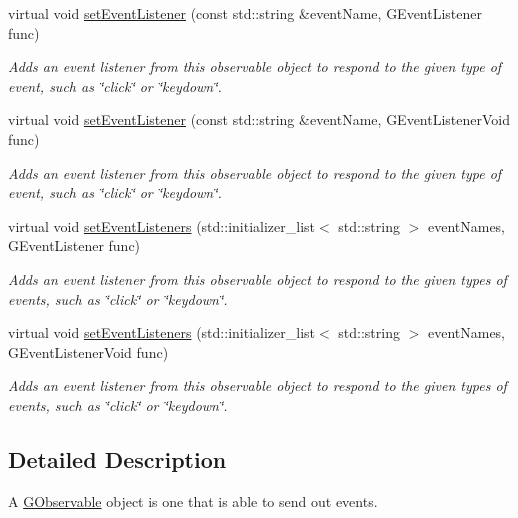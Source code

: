 \begin{DoxyCompactItemize}
virtual void \mbox{\hyperlink{classGObservable_ad2f6d34961c50f6c1e0659990b79f741}{set\+Event\+Listener}} (const std\+::string \&event\+Name, G\+Event\+Listener func)
\begin{DoxyCompactList}\small\item\em Adds an event listener from this observable object to respond to the given type of event, such as \char`\"{}click\char`\"{} or \char`\"{}keydown\char`\"{}. \end{DoxyCompactList}\item 
virtual void \mbox{\hyperlink{classGObservable_abac4cb9f9e626e010e87f5d91573c8a5}{set\+Event\+Listener}} (const std\+::string \&event\+Name, G\+Event\+Listener\+Void func)
\begin{DoxyCompactList}\small\item\em Adds an event listener from this observable object to respond to the given type of event, such as \char`\"{}click\char`\"{} or \char`\"{}keydown\char`\"{}. \end{DoxyCompactList}\item 
virtual void \mbox{\hyperlink{classGObservable_afa388d69c33c718cf035774604065604}{set\+Event\+Listeners}} (std\+::initializer\+\_\+list$<$ std\+::string $>$ event\+Names, G\+Event\+Listener func)
\begin{DoxyCompactList}\small\item\em Adds an event listener from this observable object to respond to the given types of events, such as \char`\"{}click\char`\"{} or \char`\"{}keydown\char`\"{}. \end{DoxyCompactList}\item 
virtual void \mbox{\hyperlink{classGObservable_a7867184bbb686f74fae8a4db927da799}{set\+Event\+Listeners}} (std\+::initializer\+\_\+list$<$ std\+::string $>$ event\+Names, G\+Event\+Listener\+Void func)
\begin{DoxyCompactList}\small\item\em Adds an event listener from this observable object to respond to the given types of events, such as \char`\"{}click\char`\"{} or \char`\"{}keydown\char`\"{}. \end{DoxyCompactList}\end{DoxyCompactItemize}


\subsection{Detailed Description}
A \mbox{\hyperlink{classGObservable}{G\+Observable}} object is one that is able to send out events. 

